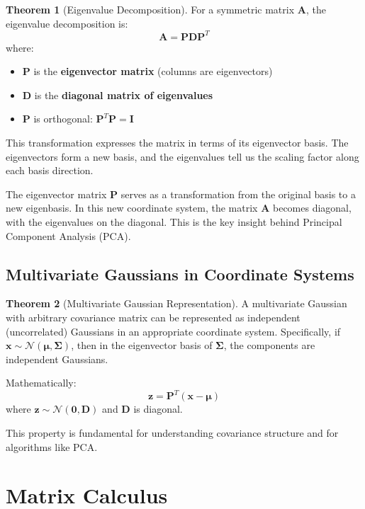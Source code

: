 \documentclass[12pt,a4paper]{article}
\theoremstyle{definition}
\newtheorem{theorem}{Theorem}[section]
\begin{document}
\begin{theorem}[Eigenvalue Decomposition]
For a symmetric matrix $\mathbf{A}$, the eigenvalue decomposition is:
\[
\mathbf{A} = \mathbf{P} \mathbf{D} \mathbf{P}^T
\]
where:
\begin{itemize}
    \item $\mathbf{P}$ is the \textbf{eigenvector matrix} (columns are eigenvectors)
    \item $\mathbf{D}$ is the \textbf{diagonal matrix of eigenvalues}
    \item $\mathbf{P}$ is orthogonal: $\mathbf{P}^T \mathbf{P} = \mathbf{I}$
\end{itemize}

This transformation expresses the matrix in terms of its eigenvector basis. The eigenvectors form a new basis, and the eigenvalues tell us the scaling factor along each basis direction.
\end{theorem}

The eigenvector matrix $\mathbf{P}$ serves as a transformation from the original basis to a new eigenbasis. In this new coordinate system, the matrix $\mathbf{A}$ becomes diagonal, with the eigenvalues on the diagonal. This is the key insight behind Principal Component Analysis (PCA).

\subsection{Multivariate Gaussians in Coordinate Systems}

\begin{theorem}[Multivariate Gaussian Representation]
A multivariate Gaussian with arbitrary covariance matrix can be represented as independent (uncorrelated) Gaussians in an appropriate coordinate system. Specifically, if $\mathbf{x} \sim \mathcal{N}(\boldsymbol{\mu}, \boldsymbol{\Sigma})$, then in the eigenvector basis of $\boldsymbol{\Sigma}$, the components are independent Gaussians.

Mathematically:
\[
\mathbf{z} = \mathbf{P}^T (\mathbf{x} - \boldsymbol{\mu})
\]
where $\mathbf{z} \sim \mathcal{N}(\mathbf{0}, \mathbf{D})$ and $\mathbf{D}$ is diagonal.

This property is fundamental for understanding covariance structure and for algorithms like PCA.
\end{theorem}

\section{Matrix Calculus}
\end{document}
